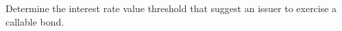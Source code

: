 \documentclass[12pt,a4paper]{book}
\begin{document}
%
%
%
%

\begin{question}[subtitle=To Exercise or Not To Exercise (\texttt{python})]
Determine the interest rate value threshold that suggest an issuer to exercise a callable bond.
\end{question}
\end{document}
